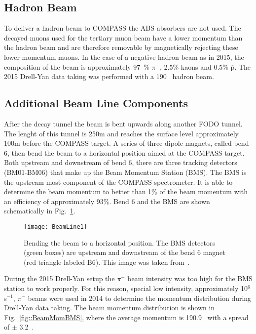 \subsection{Hadron Beam}
To deliver a hadron beam to COMPASS the ABS absorbers are not used.  The decayed
muons used for the tertiary muon beam have a lower momentum than the hadron beam
and are therefore removable by magnetically rejecting these lower momentum
muons.  In the case of a negative hadron beam as in 2015, the composition of the
beam is approximately 97~\% $\pi^-$, 2.5\% kaons and 0.5\%
$\overline{\mathrm{p}}$. The 2015 Drell-Yan data taking was performed with a
190~{\gvc} hadron beam. \par

\subsection{Additional Beam Line Components} \label{sec::addBeam}
After the decay tunnel the beam is bent upwards along another FODO tunnel.  The
lenght of this tunnel is 250m and reaches the surface level approximately 100m
before the COMPASS target.  A series of three dipole magnets, called bend 6,
then bend the beam to a horizontal position aimed at the COMPASS target.  Both
upstream and downstream of bend 6, there are three tracking detectors
(BM01-BM06) that make up the Beam Momentum Station (BMS).  The BMS is the
upstream most component of the COMPASS spectrometer.  It is able to determine
the beam momentum to better than 1\% of the beam momentum with an efficiency of
approximately 93\%.  Bend 6 and the BMS are shown schematically in
Fig.~\ref{fig::BeamLine1}. \par

\begin{figure}[h!t]
  \centering
  \texttt{[image: BeamLine1]}
  \caption{Bending the beam to a horizontal position.  The BMS detectors (green
    boxes) are upstream and downstream of the bend 6 magnet (red triangle
    labeled B6).  This image was taken from~\cite{compassSpec}.}
  \label{fig::BeamLine1}
\end{figure}

During the 2015 Drell-Yan setup the $\pi^-$ beam intensity was too high for the
BMS station to work properly.  For this reason, special low intensity,
approximately 10$^6$ s$^{-1}$, $\pi^-$ beams were used in 2014 to determine the
momentum distribution during Drell-Yan data taking.  The beam momentum
distribution is shown in Fig.~\ref{fig::BeamMomBMS}, where the average momentum
is 190.9~{\gvc} with a spread of $\pm$ 3.2~{\gvc}. \par

